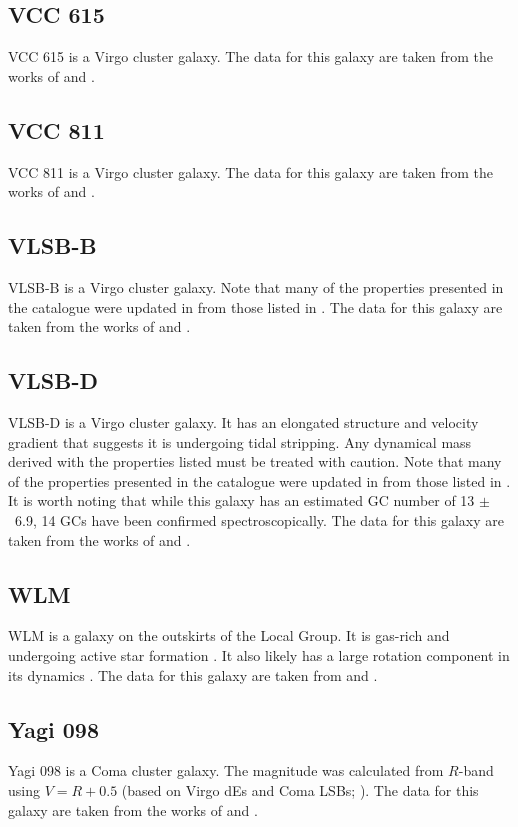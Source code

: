 \subsection{VCC 615}
VCC 615 is a Virgo cluster galaxy. The data for this galaxy are taken from the works of \citet{Lim2020} and \citet{Toloba2023}.

\subsection{VCC 811}
VCC 811 is a Virgo cluster galaxy. The data for this galaxy are taken from the works of \citet{Lim2020} and \citet{Toloba2023}.

\subsection{VLSB-B}
VLSB-B is a Virgo cluster galaxy. Note that many of the properties presented in the catalogue were updated in \cite{Toloba2023} from those listed in \cite{Toloba2018}. The data for this galaxy are taken from the works of \citet{Toloba2018, Lim2020} and \citet{Toloba2023}. 

\subsection{VLSB-D}
VLSB-D is a Virgo cluster galaxy. It has an elongated structure and velocity gradient \citep{Toloba2018} that suggests it is undergoing tidal stripping. Any dynamical mass derived with the properties listed must be treated with caution. Note that many of the properties presented in the catalogue were updated in \cite{Toloba2023} from those listed in \cite{Toloba2018}. It is worth noting that while this galaxy has an estimated GC number of 13 $\pm$~6.9, 14 GCs have been confirmed spectroscopically. The data for this galaxy are taken from the works of \citet{Toloba2018, Lim2020} and \citet{Toloba2023}. 

\subsection{WLM}
WLM is a galaxy on the outskirts of the Local Group. It is gas-rich and undergoing active star formation \citep{Leaman2009}. It also likely has a large rotation component in its dynamics \citep{Leaman2009}.
The data for this galaxy are taken from \citet{mcconnachie2012} and \citet{Forbes2018}. 

\subsection{Yagi 098}
Yagi 098 is a Coma cluster galaxy. The magnitude was calculated from $R$-band using $V = R + 0.5$ (based on Virgo dEs and Coma LSBs; \citealp{vanZee2004, Alabi2020}). The data for this galaxy are taken from the works of \citet{Yagi2016, Alabi2018} and \citet{FerreMateu2018}. 

